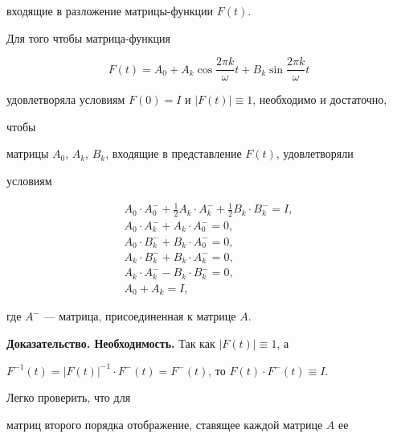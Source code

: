 входящие в разложение матрицы-функции $F(t)$. 


 


 


\begin{thm} 


Для того чтобы матрица-функция 


$$ 


F(t)=A_0+A_k\cos\frac{2\pi k}{\omega}t+ 


B_k\sin\frac{2\pi k}{\omega}t 


$$ 


удовлетворяла условиям $F(0)=I$ и $|F(t)|\equiv1$, необходимо и достаточно, 


чтобы 


матрицы $A_0$, $A_k$, $B_k$, входящие в представление $F(t)$, удовлетворяли 


условиям 


\begin{gather} 


A_0\cdot A^-_0+\frac{1}{2}A_k\cdot A^-_k+ 


\frac{1}{2}B_k\cdot B^-_k=I, \\ 


A_0\cdot A^-_k+A_k\cdot A^-_0=0,\\ 


A_0\cdot B^-_k+B_k\cdot A^-_0=0,\\ 


A_k\cdot B^-_k+B_k\cdot A^-_k=0,\\ 


A_k\cdot A^-_k-B_k\cdot B^-_k=0, \\


A_0+A_k=I, 


\end{gather} 


где $A^-$ --- матрица, присоединенная к матрице $A$. 


\end{thm} 


 


 


{\bf Доказательство. Необходимость.} Так как $|F(t)|\equiv1$, а 


$F^{-1}(t)=|F(t)|^{-1}\cdot F^-(t)=F^-(t)$, то $F(t)\cdot F^-(t)\equiv I$.


Легко проверить, что для 


матриц второго порядка отображение, ставящее каждой матрице $A$ ее 


